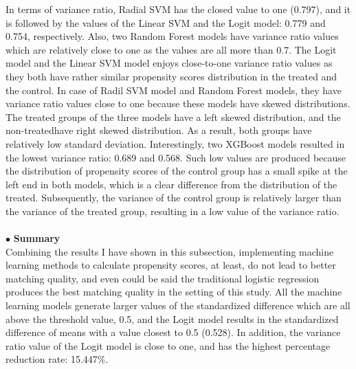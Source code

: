 \documentclass[11pt,a4paper,oneside]{article}
\begin{document}
\par
In terms of variance ratio, Radial SVM has the closed value to one (0.797), and it is followed by the values of the Linear SVM and the Logit model: 0.779 and 0.754, respectively. Also, two Random Forest models have variance ratio values which are relatively close to one as the values are all more than 0.7. The Logit model and the Linear SVM model enjoys close-to-one variance ratio values as they both have rather similar propensity scores distribution in the treated and the control. In case of Radil SVM model and Random Forest models, they have variance ratio values close to one because these models have skewed distributions. The treated groups of the three models have a left skewed distribution, and the non-treatedhave right skewed distribution. As a result, both groups have relatively low standard deviation. Interestingly, two XGBoost models resulted in the lowest variance ratio: 0.689 and 0.568. Such low values are produced because the distribution of propensity scores of the control group has a small spike at the left end in both models, which is a clear difference from the distribution of the treated. Subsequently, the variance of the control group is relatively larger than the variance of the treated group, resulting in a low value of the variance ratio.
\\\\
$\bullet$ \textbf{Summary}\\
Combining the results I have shown in this subsection, implementing machine learning methods to calculate propensity scores, at least, do not lead to better matching quality, and even could be said the traditional logistic regression produces the best matching quality in the setting of this study. All the machine learning models generate larger values of the standardized difference which are all above the threshold value, 0.5, and the Logit model results in the standardized difference of means with a value closest to 0.5 (0.528). In addition, the variance ratio value of the Logit model is close to one, and has the highest percentage reduction rate: 15.447\%.

\end{document}
